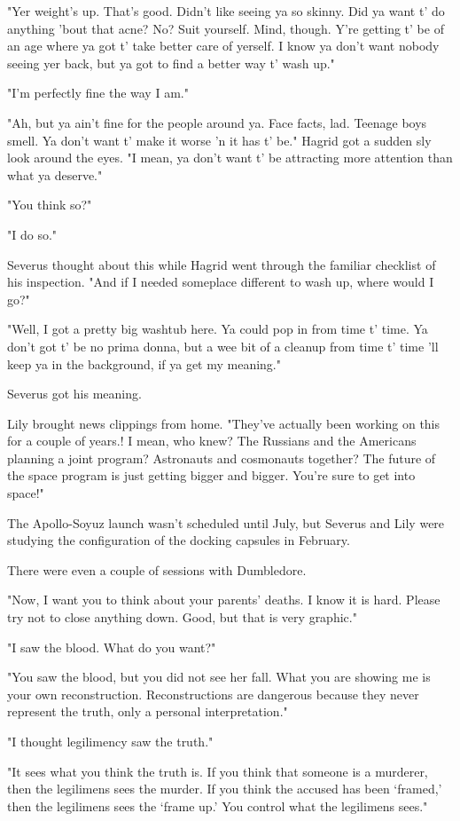 "Yer weight's up. That's good. Didn't like seeing ya so skinny. Did ya want t' do anything 'bout that acne? No? Suit yourself. Mind, though. Y're getting t' be of an age where ya got t' take better care of yerself. I know ya don't want nobody seeing yer back, but ya got to find a better way t' wash up."

"I'm perfectly fine the way I am."

"Ah, but ya ain't fine for the people around ya. Face facts, lad. Teenage boys smell. Ya don't want t' make it worse 'n it has t' be." Hagrid got a sudden sly look around the eyes. "I mean, ya don't want t' be attracting more attention than what ya deserve."

"You think so?"

"I do so."

Severus thought about this while Hagrid went through the familiar checklist of his inspection. "And if I needed someplace different to wash up, where would I go?"

"Well, I got a pretty big washtub here. Ya could pop in from time t' time. Ya don't got t' be no prima donna, but a wee bit of a cleanup from time t' time 'll keep ya in the background, if ya get my meaning."

Severus got his meaning.

Lily brought news clippings from home. "They've actually been working on this for a couple of years.! I mean, who knew? The Russians and the Americans planning a joint program? Astronauts and cosmonauts together? The future of the space program is just getting bigger and bigger. You're sure to get into space!"

The Apollo-Soyuz launch wasn't scheduled until July, but Severus and Lily were studying the configuration of the docking capsules in February.

There were even a couple of sessions with Dumbledore.

"Now, I want you to think about your parents' deaths. I know it is hard. Please try not to close anything down. Good, but that is very graphic."

"I saw the blood. What do you want?"

"You saw the blood, but you did not see her fall. What you are showing me is your own reconstruction. Reconstructions are dangerous because they never represent the truth, only a personal interpretation."

"I thought legilimency saw the truth."

"It sees what you think the truth is. If you think that someone is a murderer, then the legilimens sees the murder. If you think the accused has been `framed,' then the legilimens sees the `frame up.' You control what the legilimens sees."

